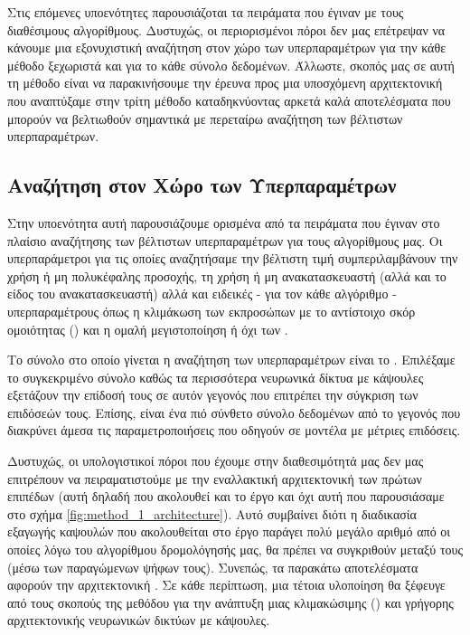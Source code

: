Στις επόμενες υπο\textendash ενότητες παρουσιάζοται τα πειράματα που έγιναν με τους διαθέσιμους αλγορίθμους. Δυστυχώς, οι περιορισμένοι πόροι δεν μας επέτρεψαν να κάνουμε μια εξονυχιστική αναζήτηση στον χώρο των υπερπαραμέτρων για την κάθε μέθοδο ξεχωριστά και για το κάθε σύνολο δεδομένων. Άλλωστε, σκοπός μας σε αυτή τη μέθοδο είναι να παρακινήσουμε την έρευνα προς μια υποσχόμενη αρχιτεκτονική που αναπτύξαμε στην τρίτη μέθοδο καταδηκνύοντας αρκετά καλά αποτελέσματα που μπορούν να βελτιωθούν σημαντικά με περεταίρω αναζήτηση των βέλτιστων υπερπαραμέτρων.\par

\subsection{Αναζήτηση στον Χώρο των Υπερπαραμέτρων}
Στην υποενότητα αυτή παρουσιάζουμε ορισμένα από τα πειράματα που έγιναν στο πλαίσιο αναζήτησης των βέλτιστων υπερπαραμέτρων για τους αλγορίθμους μας. Οι υπερπαράμετροι για τις οποίες αναζητήσαμε την βέλτιστη τιμή συμπεριλαμβάνουν την χρήση ή μη πολυκέφαλης προσοχής, τη χρήση ή μη ανακατασκευαστή (αλλά και το είδος του ανακατασκευαστή) αλλά και ειδεικές - για τον κάθε αλγόριθμο - υπερπαραμέτρους όπως η κλιμάκωση των εκπροσώπων με το αντίστοιχο σκόρ ομοιότητας () και η ομαλή μεγιστοποίηση ή όχι των .\par

Το σύνολο στο οποίο γίνεται η αναζήτηση των υπερπαραμέτρων είναι το . Επιλέξαμε το συγκεκριμένο σύνολο καθώς τα περισσότερα νευρωνικά δίκτυα με κάψουλες εξετάζουν την επίδοσή τους σε αυτόν γεγονός που επιτρέπει την σύγκριση των επιδόσεών τους. Επίσης, είναι ένα πιό σύνθετο σύνολο δεδομένων από το  γεγονός που διακρύνει άμεσα τις παραμετροποιήσεις που οδηγούν σε μοντέλα με μέτριες επιδόσεις.\par

Δυστυχώς, οι υπολογιστικοί πόροι που έχουμε στην διαθεσιμότητά μας δεν μας επιτρέπουν να πειραματιστούμε με την εναλλακτική αρχιτεκτονική των πρώτων επιπέδων (αυτή δηλαδή που ακολουθεί και το έργο \cite{hinton2018matrix} και όχι αυτή που παρουσιάσαμε στο σχήμα \ref{fig:method_1_architecture}). Αυτό συμβαίνει διότι η διαδικασία εξαγωγής καψουλών που ακολουθείται στο έργο \cite{sabour2017dynamic} παράγει πολύ μεγάλο αριθμό από  οι οποίες λόγω του αλγορίθμου δρομολόγησής μας, θα πρέπει να συγκριθούν μεταξύ τους (μέσω των παραγώμενων ψήφων τους). Συνεπώς, τα παρακάτω αποτελέσματα αφορούν την αρχιτεκτονική . Σε κάθε περίπτωση, μια τέτοια υλοποίηση θα ξέφευγε από τους σκοπούς της μεθόδου για την ανάπτυξη μιας κλιμακώσιμης () και γρήγορης αρχιτεκτονικής νευρωνικών δικτύων με κάψουλες.\par

